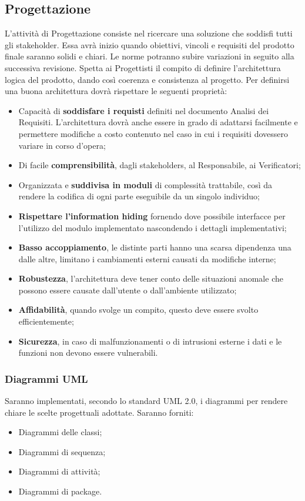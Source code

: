 \documentclass[11pt,a4paper]{article}
\begin{document}
	\subsection{Progettazione}
	L'attività di Progettazione consiste nel ricercare una soluzione che soddisfi tutti gli stakeholder. Essa avrà inizio quando obiettivi, vincoli e requisiti del prodotto finale saranno solidi e chiari. Le norme potranno subire variazioni in seguito alla successiva revisione. Spetta ai Progettisti il compito di definire l'architettura logica del prodotto, dando così coerenza e consistenza al progetto. Per definirsi una buona architettura dovrà rispettare le seguenti proprietà:
	\begin{itemize}
		\item Capacità di \textbf{soddisfare i requisti} definiti nel documento Analisi dei Requisiti. L'architettura dovrà anche essere in grado di adattarsi facilmente e permettere modifiche a costo contenuto nel caso in cui i requisiti dovessero variare in corso d'opera;
		\item Di facile \textbf{comprensibilità}, dagli stakeholders, al Responsabile, ai Verificatori;
		\item Organizzata e \textbf{suddivisa in moduli} di complessità trattabile, così da rendere la codifica di ogni parte eseguibile da un singolo individuo;
		\item \textbf{Rispettare l'information hiding} fornendo dove possibile interfacce per l'utilizzo del modulo implementato nascondendo i dettagli implementativi;
		\item \textbf{Basso accoppiamento}, le distinte parti hanno una scarsa dipendenza una dalle altre, limitano i cambiamenti esterni causati da modifiche interne;
		\item \textbf{Robustezza}, l'architettura deve tener conto delle situazioni anomale che possono essere causate dall'utente o dall'ambiente utilizzato;
		\item \textbf{Affidabilità}, quando svolge un compito, questo deve essere svolto efficientemente;
		\item \textbf{Sicurezza}, in caso di malfunzionamenti o di intrusioni esterne i dati e le funzioni non devono essere vulnerabili.
	\end{itemize}	
	\subsubsection{Diagrammi UML} Saranno implementati, secondo lo standard UML 2.0, i diagrammi per rendere chiare le scelte progettuali adottate. Saranno forniti:
	\begin{itemize}
		\item Diagrammi delle classi;
		\item Diagrammi di sequenza;
		\item Diagrammi di attività;
		\item Diagrammi di package.
	\end{itemize}
\end{document}
